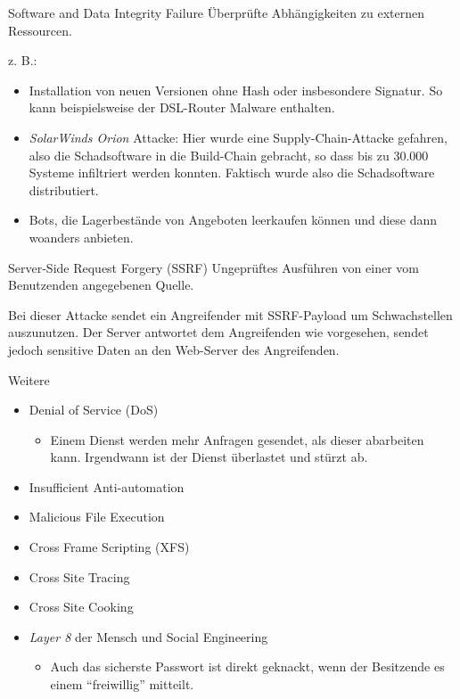 \begin{defi}{Software and Data Integrity Failure}
    Überprüfte Abhängigkeiten zu externen Ressourcen.

    z. B.:
    \begin{itemize}
        \item Installation von neuen Versionen ohne Hash oder insbesondere Signatur.
              So kann beispielsweise der DSL-Router Malware enthalten.
        \item \emph{SolarWinds Orion} Attacke: Hier wurde eine Supply-Chain-Attacke gefahren, also die Schadsoftware in die Build-Chain gebracht, so dass bis zu 30.000 Systeme infiltriert werden konnten.
              Faktisch wurde also die Schadsoftware distributiert.
        \item Bots, die Lagerbestände von Angeboten leerkaufen können und diese dann woanders anbieten.
    \end{itemize}
\end{defi}

\begin{defi}{Server-Side Request Forgery (SSRF)}
    Ungeprüftes Ausführen von einer vom Benutzenden angegebenen Quelle.

    Bei dieser Attacke sendet ein Angreifender mit SSRF-Payload um Schwachstellen auszunutzen.
    Der Server antwortet dem Angreifenden wie vorgesehen, sendet jedoch sensitive Daten an den Web-Server des Angreifenden.
\end{defi}

\begin{bonus}{Weitere}
    \begin{itemize}
        \item Denial of Service (DoS)
              \begin{itemize}
                  \item Einem Dienst werden mehr Anfragen gesendet, als dieser abarbeiten kann.
                        Irgendwann ist der Dienst überlastet und stürzt ab.
              \end{itemize}
        \item Insufficient Anti-automation
        \item Malicious File Execution
        \item Cross Frame Scripting (XFS)
        \item Cross Site Tracing
        \item Cross Site Cooking
        \item \emph{Layer 8} der Mensch und Social Engineering
              \begin{itemize}
                  \item Auch das sicherste Passwort ist direkt geknackt, wenn der Besitzende es einem \enquote{freiwillig} mitteilt.
              \end{itemize}
    \end{itemize}
\end{bonus}

